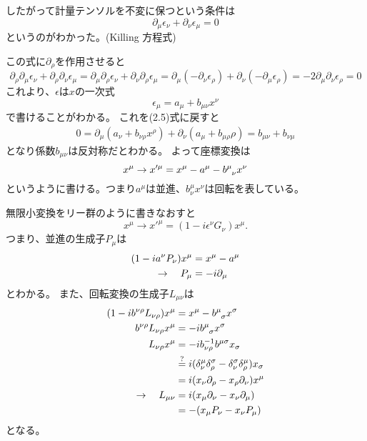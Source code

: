 \documentclass[../../master.tex]{subfiles}
\begin{document}
したがって計量テンソルを不変に保つという条件は
\begin{equation}
    \partial_\mu\epsilon_\nu + \partial_\nu\epsilon_\mu = 0
\end{equation}
というのがわかった。(Killing 方程式)

この式に\(\partial_\rho\)を作用させると
\begin{equation}
    \partial_\rho\partial_\mu\epsilon_\nu + \partial_\rho\partial_\nu\epsilon_\mu
    =\partial_\mu\partial_\rho\epsilon_\nu + \partial_\nu\partial_\rho\epsilon_\mu
    =\partial_\mu(-\partial_\nu \epsilon_\rho)+\partial_\nu(-\partial_\mu \epsilon_\rho)
    =-2\partial_\mu\partial_\nu\epsilon_\rho =0
\end{equation}
これより、\(\epsilon\)は\(x\)の一次式
\begin{equation}
    \epsilon_\mu = a_\mu + b_{\mu\nu}x^\nu
\end{equation}
で書けることがわかる。
これを(2.5)式に戻すと
\begin{align*}
    0=\partial_\mu(a_\nu+b_{\nu\rho}x^\rho) + \partial_\nu(a_\mu+b_{\mu\rho}\rho)=b_{\mu\nu}+b_{\nu\mu}
\end{align*}
となり係数\(b_{\mu\nu}\)は反対称だとわかる。
よって座標変換は
\begin{equation*}
    x^\mu\rightarrow x'^\mu = x^\mu -a^\mu -b\indices{^{\mu}_\nu}x^\nu
\end{equation*}
というように書ける。つまり\(a^\mu\)は並進、\(b_\nu^\mu x^\nu\)は回転を表している。

無限小変換をリー群のように書きなおすと
\begin{equation*}
    x^\mu\rightarrow x'^\mu = (1-i\epsilon^\nu G_\nu)x^\mu.
\end{equation*}
つまり、並進の生成子\(P_\mu\)は
\begin{align}
    (1-ia^\nu P_\nu)x^\mu&=x^\mu-a^\mu\notag\\
    \rightarrow \quad P_\mu &= -i\partial_\mu
\end{align}
とわかる。
また、回転変換の生成子\(L_{\mu\nu}\)は
\begin{align}
    (1-ib^{\nu\rho}L_{\nu\rho})x^\mu &= x^\mu - b\indices{^{\mu}_\sigma} x^\sigma \notag\\
    b^{\nu\rho}L_{\nu\rho}x^\mu &= -ib\indices{^{\mu}_\sigma} x^\sigma\notag\\
    L_{\nu\rho}x^\mu&=-ib_{\nu\rho}^{-1}b^{\mu\sigma} x_\sigma\notag\\
    &\overset{?}{=}i(\delta_\nu^\mu\delta_\rho^\sigma-\delta_\nu^\sigma\delta_\rho^\mu)x_\sigma\notag\\
    &=i(x_\nu\partial_\rho-x_\rho\partial_\nu)x^\mu\notag\\
    \rightarrow \quad L_{\mu\nu} &= i(x_\mu\partial_\nu-x_\nu\partial_\mu)\\
    &=-(x_\mu P_\nu-x_\nu P_\mu)\notag
\end{align}
となる。
\end{document}

